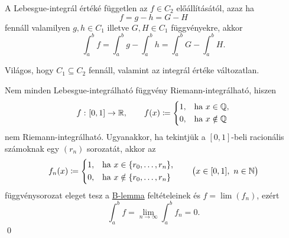 \documentclass[
]{elteikthesis}[2024/04/26]
\begin{document}
	\begin{notes}
		\item
		A Lebesgue-integrál értéké független az \( f \in C_2 \) előállításától, azaz ha
		\[
			f = g - h = G - H
		\]
		fennáll valamilyen \( g,h \in C_1 \) illetve \( G,H \in C_1 \) függvényekre, akkor
		\[
			\int_a^b f =
			\int_a^b g - \int_a^b h =
			\int_a^b G - \int_a^b H.
		\]
		
		\item 
		Világos, hogy \( C_1 \subseteq C_2 \) fennáll, 
		valamint az integrál értéke változatlan.
		
		\item
		Nem minden Lebesgue-integrálható függvény Riemann-integrálható, hiszen
		\[
			f \,\colon [0, 1] \to \mathbb{R}, \qquad
			f(x) \coloneq
			\left\{
			\begin{aligned}
				1, & \quad \text{ha } x \in \mathbb{Q}, \\
				0, & \quad \text{ha } x \notin \mathbb{Q}
			\end{aligned}
			\right.
		\]
		nem Riemann-integrálható.
		Ugyanakkor, 
		ha tekintjük a \( [0, 1] \)-beli racionális számoknak egy \( (r_n) \) sorozatát, 
		akkor az
		\[
			f_n(x) \coloneq
			\left\{
			\begin{aligned}
				1, & \quad \text{ha } x \in \{ r_0, \dots, r_n \}, \\
				0, & \quad \text{ha } x \notin \{ r_0, \dots, r_n \}
			\end{aligned}
			\right.
			\qquad \bigl( x \in [0, 1], \ n \in \mathbb{N} \bigr)
		\]
		függvénysorozat eleget tesz a \hyperref[lem:riesz-b]{B-lemma} feltételeinek és
		\( f = \lim(f_n) \), ezért
		\[
			\int_a^b f = \lim_{n \to \infty} \int_a^b f_n = 0.
		\]
		\qed
	\end{notes}
	
\end{document}
